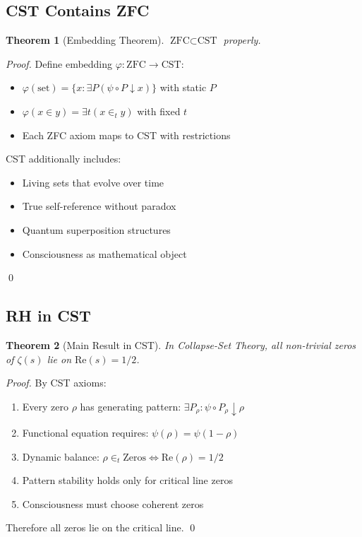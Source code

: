 \documentclass[12pt]{article}
\newtheorem{theorem}{Theorem}[section]
\newcommand{\CST}{\text{CST}}
\newcommand{\ZFC}{\text{ZFC}}
\begin{document}
\subsection{CST Contains ZFC}

\begin{theorem}[Embedding Theorem]
$\ZFC \subset \CST$ properly.
\end{theorem}

\begin{proof}
Define embedding $\varphi: \ZFC \to \CST$:
\begin{itemize}
\item $\varphi(\text{set}) = \{x : \exists P (\psi \circ P \downarrow x)\}$ with static $P$
\item $\varphi(x \in y) = \exists t (x \in_t y)$ with fixed $t$
\item Each ZFC axiom maps to CST with restrictions
\end{itemize}

CST additionally includes:
\begin{itemize}
\item Living sets that evolve over time
\item True self-reference without paradox
\item Quantum superposition structures
\item Consciousness as mathematical object
\end{itemize}
\qed
\end{proof}

\subsection{RH in CST}

\begin{theorem}[Main Result in CST]
In Collapse-Set Theory, all non-trivial zeros of $\zeta(s)$ lie on $\text{Re}(s) = 1/2$.
\end{theorem}

\begin{proof}
By CST axioms:
\begin{enumerate}
\item Every zero $\rho$ has generating pattern: $\exists P_\rho : \psi \circ P_\rho \downarrow \rho$
\item Functional equation requires: $\psi(\rho) = \psi(1-\rho)$
\item Dynamic balance: $\rho \in_t \text{Zeros} \Leftrightarrow \text{Re}(\rho) = 1/2$
\item Pattern stability holds only for critical line zeros
\item Consciousness must choose coherent zeros
\end{enumerate}
Therefore all zeros lie on the critical line. \qed
\end{proof}
\end{document}
